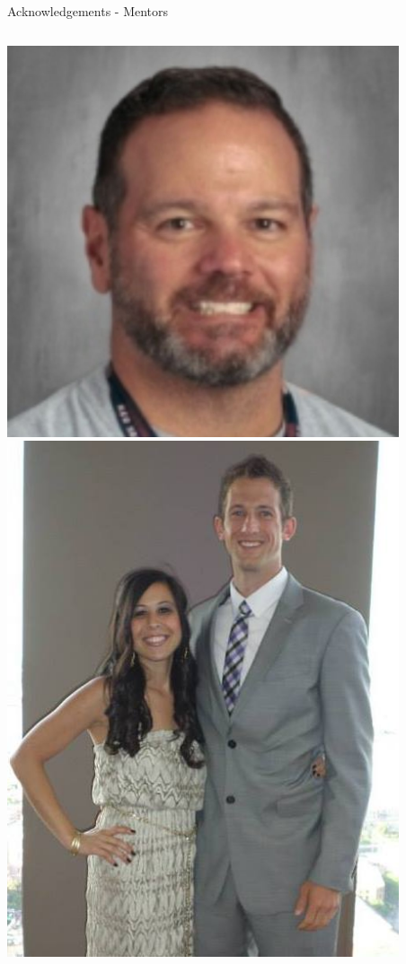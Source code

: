 \documentclass[aspectratio=169]{beamer}
\begin{document}
\begin{frame}{Acknowledgements - Mentors}
    \begin{columns}
            \centering
            \includegraphics[width=0.865\textwidth]{people/coaches/cullen.png}
            \includegraphics[width=0.865\textwidth]{people/coaches/maly.png}

\end{columns}
\end{frame}
\end{document}
